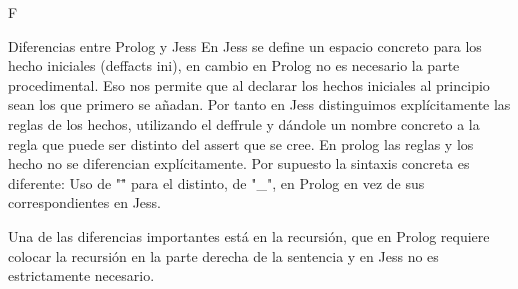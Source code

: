 F\documentclass[11pt, a4paper, spanish, openright, twoside]{book}
\begin{document}
\begin{section}{Diferencias entre Prolog y Jess}
		En Jess se define un espacio concreto para los hecho iniciales (deffacts ini), en cambio en Prolog no es necesario la parte procedimental. Eso nos permite que 
		al declarar los hechos iniciales al principio sean los que primero se añadan.
		Por tanto en Jess distinguimos explícitamente las reglas de los hechos, utilizando el deffrule y dándole un nombre concreto a la regla que puede ser distinto del assert que se cree. En prolog las reglas 
		y los hecho no se diferencian explícitamente.
		Por supuesto la sintaxis concreta es diferente: Uso de "\=" para el distinto, de "_",  en Prolog en vez de sus correspondientes en Jess.
		
		Una de las diferencias importantes está en la recursión, que en Prolog requiere colocar la recursión en la parte derecha de la sentencia y en Jess no es estrictamente necesario.
		

	
\end{section}
	\newpage
\end{document}
